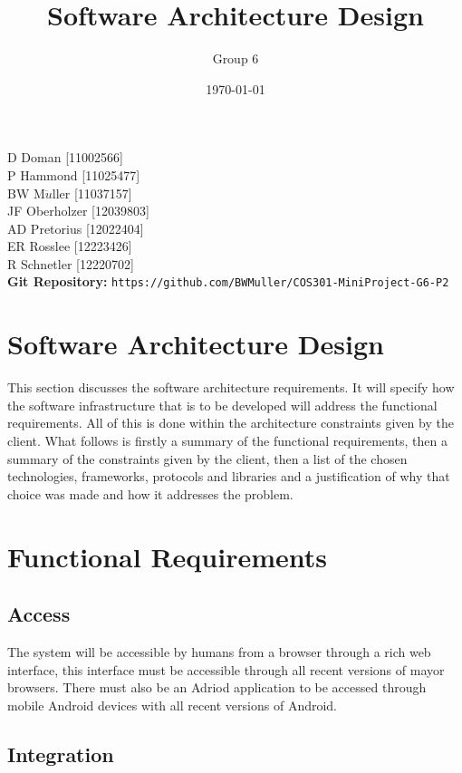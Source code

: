 \documentclass[a4paper]{article}
\title{Software Architecture Design}
\author{Group 6}
\date{\today}
\begin{document}
\maketitle
\begin{center}
D Doman [11002566]\\
P Hammond [11025477]\\
BW M$\ddot{u}$ller [11037157]\\
JF Oberholzer [12039803]\\
AD Pretorius [12022404]\\
ER Rosslee [12223426]\\
R Schnetler [12220702]\\
\textbf{Git Repository: } \texttt{https://github.com/BWMuller/COS301-MiniProject-G6-P2}

\end{center}
\pagebreak

\section{Software Architecture Design}

This section discusses the software architecture requirements. It will specify how the software infrastructure that is to be developed will address the functional requirements. All of this is done within the architecture constraints given by the client. What follows is firstly a summary of the functional requirements, then a summary of the constraints given by the client, then a list of the chosen technologies, frameworks, protocols and libraries and a justification of why that choice was made and how it addresses the problem. 

\section{Functional Requirements}

\subsection{Access}

The system will be accessible by humans from a browser through a rich web interface, this interface must be accessible through all recent versions of mayor browsers. There must also be an Adriod application to be accessed through mobile Android devices with all recent versions of Android.
	
\subsection{Integration}
\end{document}
